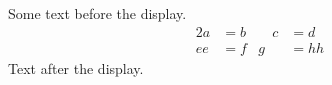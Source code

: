 \documentclass[12pt]{article}
\begin{document}
Some text before the display.
\begin{alignat}{2} a &= b &\quad c &= d \\ ee &= f & g &= hh \end{alignat}
Text after the display.
\end{document}
